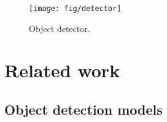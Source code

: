\documentclass[10pt,twocolumn,letterpaper]{article}
\begin{document}
\vspace{-2mm}





\begin{figure*}[t]
	\begin{center}
		\texttt{[image: fig/detector]}
	\end{center}
    \vspace{-4mm}
	\caption{Object detector.  }
	\label{fig:detector}
\end{figure*}

\section{Related work}

\subsection{Object detection models}
\end{document}
